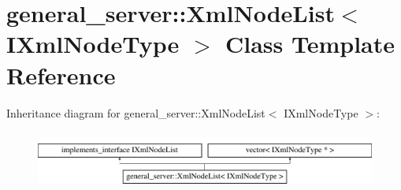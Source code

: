 \hypertarget{classgeneral__server_1_1XmlNodeList}{\section{general\-\_\-server\-:\-:\-Xml\-Node\-List$<$ \-I\-Xml\-Node\-Type $>$ \-Class \-Template \-Reference}
\label{classgeneral__server_1_1XmlNodeList}
}
\-Inheritance diagram for general\-\_\-server\-:\-:\-Xml\-Node\-List$<$ \-I\-Xml\-Node\-Type $>$\-:\begin{figure}[H]
\begin{center}
\leavevmode
\includegraphics[height=1.937716cm]{classgeneral__server_1_1XmlNodeList}
\end{center}
\end{figure}
